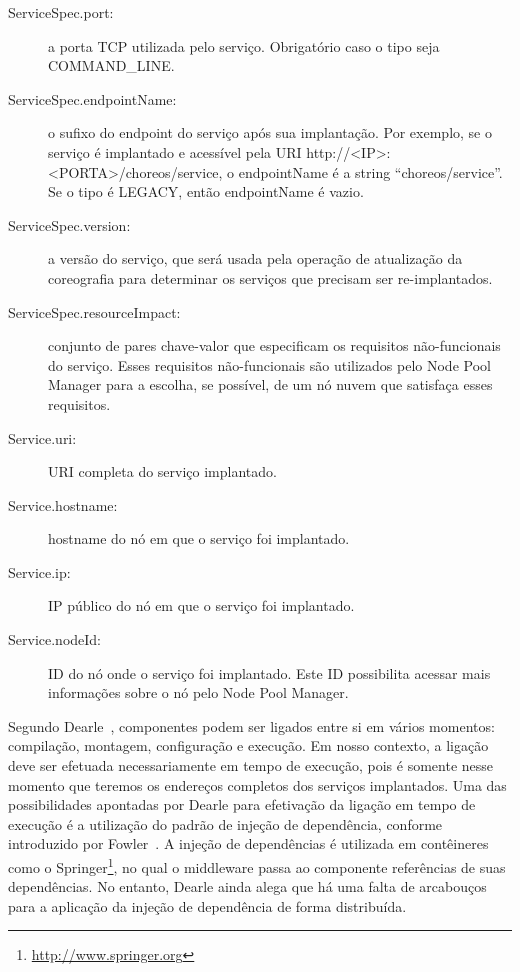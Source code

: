 \begin{description}
\item [ServiceSpec.port:] a porta TCP utilizada pelo serviço. Obrigatório caso o tipo seja COMMAND\_LINE.

\item [ServiceSpec.endpointName:] o sufixo do endpoint do serviço após sua implantação. Por exemplo, se o serviço é implantado e acessível pela URI http://<IP>:<PORTA>/choreos/service, o endpointName é a string ``choreos/service''. Se o tipo é LEGACY, então endpointName é vazio.

\item [ServiceSpec.version:] a versão do serviço, que será usada pela operação de atualização da coreografia para determinar os serviços que precisam ser re-implantados.

\item [ServiceSpec.resourceImpact:] conjunto de pares chave-valor que especificam os requisitos não-funcionais do serviço. Esses requisitos não-funcionais são utilizados pelo Node Pool Manager para a escolha, se possível, de um nó nuvem que satisfaça esses requisitos.

\item [Service.uri:] URI completa do serviço implantado.

\item [Service.hostname:] hostname do nó em que o serviço foi implantado.

\item [Service.ip:] IP público do nó em que o serviço foi implantado.

\item [Service.nodeId:] ID do nó onde o serviço foi implantado. Este ID possibilita acessar mais informações sobre o nó pelo Node Pool Manager. 

\end{description}

Segundo Dearle~\cite{Dearle2007PastPresentFuture}, componentes podem ser ligados entre si em vários momentos: compilação, montagem, configuração e execução. Em nosso contexto, a ligação deve ser efetuada necessariamente em tempo de execução, pois é somente nesse momento que teremos os endereços completos dos serviços implantados. Uma das possibilidades apontadas por Dearle para efetivação da ligação em tempo de execução é a utilização do padrão de injeção de dependência, conforme introduzido por Fowler~\cite{Fowler2004Inversion}. A injeção de dependências é utilizada em contêineres como o Springer\footnote{\url{http://www.springer.org}}, no qual o middleware passa ao componente referências de suas dependências. No entanto, Dearle ainda alega que há uma falta de arcabouços para a aplicação da injeção de dependência de forma distribuída.

